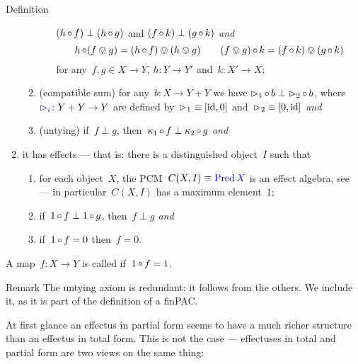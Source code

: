 \documentclass[b]{subfiles}
\begin{document}
\begin{parsec}
\begin{point}{Definition}
\begin{enumerate}
\begin{enumerate}
\begin{enumerate}
                $(h \mathop{\circ} f) \perp (h \mathop{\circ} g)$ and
                $(f \mathop{\circ} k) \perp (g \mathop{\circ} k)$ \emph{and}
            \begin{equation*}
                 h \mathop{\circ} (f \ovee g) = 
                (h \mathop{\circ} f) \ovee (h \ovee g)\qquad
                (f \ovee g) \mathop{\circ} k = 
                (f \mathop{\circ} k) \ovee (g \mathop{\circ} k)
            \end{equation*}
                for any~$f,g \in X \to Y$,
                $h\colon Y \to Y'$
                and~$k \colon X'\to X$;
            \end{enumerate}
        \item
            (compatible sum)
            for any~$b\colon X \to Y + Y$ we have
            $\mathord{\vartriangleright}_1 \mathop{\circ} b \perp \mathord{\vartriangleright}_2 \mathop{\circ} b$,
            where~$\Define{\pproj_i}\colon Y + Y \to Y$
            are  defined
            by~$\mathord{\vartriangleright}_1 \equiv [\operatorname{id}, 0]$
            and~$\mathord{\vartriangleright}_2 \equiv [0, \operatorname{id}]$ \emph{and}
        \item
            (untying) if~$f\perp g$,
            then~$\kappa_1\mathop{\circ} f \perp \kappa_2 \mathop{\circ} g$ \emph{and}
    \end{enumerate}
    \item it has effects --- that is: there is a distinguished object~$I$
            such that
    \begin{enumerate}
        \item for each object~$X$, the PCM~$C(X,I) \equiv \Define{\Pred X}$
            is an effect algebra, see 
            --- in particular~$C(X,I)$
                has a maximum element~$1$;
        \item if~$1 \mathop{\circ} f \perp 1 \mathop{\circ} g$,
            then~$f \perp g$ \emph{and}
        \item if~$1 \mathop{\circ} f = 0$ then~$f = 0$.
    \end{enumerate}
\end{enumerate}
A map~$f\colon X \to Y$ is called  if~$1 \mathop{\circ} f = 1$.
\begin{point}{Remark}%
The untying axiom is redundant: it follows from the others.
We include it, as it is part
    of the definition of a finPAC.
\end{point}
\begin{point}%
At first glance an effectus in partial form seems
    to have a much richer structure than an effectus in total form.
This is not the case ---
    effectuses in total and partial form are two views
    on the same thing: \cite{kentapartial,introeff}

\end{point}
\end{point}
\end{parsec}
\end{document}
